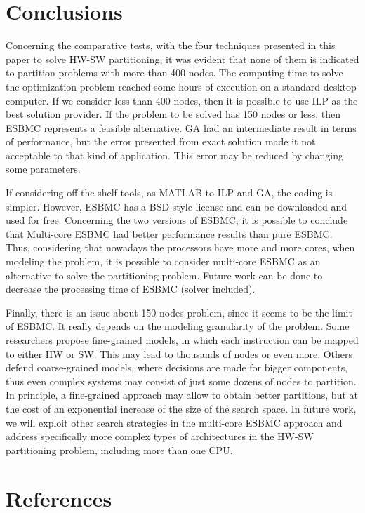 \section{Conclusions}
Concerning the comparative tests, with the four techniques presented in this paper to solve HW-SW partitioning, it was evident that none of them is indicated to partition problems with more than 400 nodes. The computing time to solve the optimization problem reached some hours of execution on a standard desktop computer. If we consider less than 400 nodes, then it is possible to use ILP as the best solution provider. If the problem to be solved has 150 nodes or less, then ESBMC represents a feasible alternative. GA had an intermediate result in terms of performance, but the error presented from exact solution made it not acceptable to that kind of application. This error may be reduced by changing some parameters.

If considering off-the-shelf tools, as MATLAB to ILP and GA, the coding is simpler. However, ESBMC has a BSD-style license and can be downloaded and used for free. Concerning the two versions of ESBMC, it is possible to conclude that Multi-core ESBMC had better performance results than pure ESBMC. Thus, considering that nowadays the processors have more and more cores, when modeling the problem, it is possible to consider multi-core ESBMC as an alternative to solve the partitioning problem. Future work can be done to decrease the processing time of ESBMC (solver included).

Finally, there is an issue about 150 nodes problem, since it seems to be the limit of ESBMC. It really depends on the modeling granularity of the problem. Some researchers propose fine-grained models, in which each instruction can be mapped to either HW or SW. This may lead to thousands of nodes or even more. Others defend coarse-grained models, where decisions are made for bigger components, thus even complex systems may consist of just some dozens of nodes to partition. In principle, a fine-grained approach may allow to obtain better partitions, but at the cost of an exponential increase of the size of the search space. In future work, we will exploit other search strategies in the multi-core ESBMC approach and address specifically more complex types of architectures in the HW-SW partitioning problem, including more than one CPU.
\section{References}






